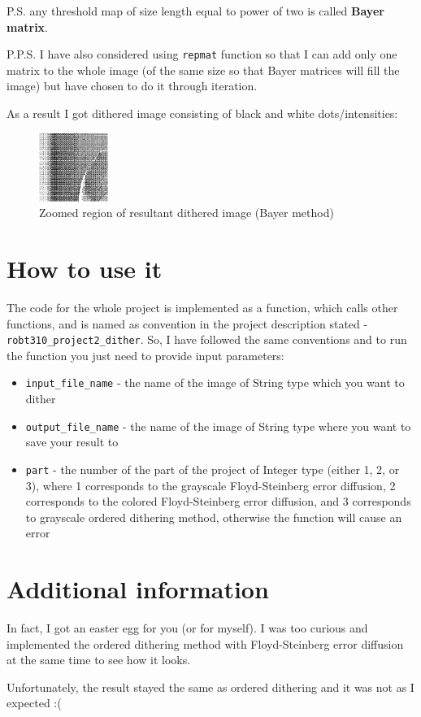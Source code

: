 \documentclass{IEEEtran}
\begin{document}
P.S. any threshold map of size length equal to power of two is called \textbf{Bayer matrix}.

P.P.S. I have also considered using \texttt{repmat} function so that I can add only one matrix to the whole image (of the same size so that Bayer matrices will fill the image) but have chosen to do it through iteration.

As a result I got dithered image consisting of black and white dots/intensities:

\begin{figure}[h]
	\centering
	\includegraphics[width=0.20\textwidth]{ordered_result_zoomed.png}
	\caption{Zoomed region of resultant dithered image (Bayer method)}
\end{figure}



\section{How to use it}
The code for the whole project is implemented as a function, which calls other functions, and is named as convention in the project description stated - \texttt{robt310{\_}project2{\_}dither}. So, I have followed the same conventions and to run the function you just need to provide input parameters:

\begin{itemize}
  \item \texttt{input{\_}file{\_}name} - the name of the image of String type which you want to dither
  \item \texttt{output{\_}file{\_}name} - the name of the image of String type where you want to save your result to
  \item \texttt{part} - the number of the part of the project of Integer type (either 1, 2, or 3), where 1 corresponds to the grayscale Floyd-Steinberg error diffusion, 2 corresponds to the colored Floyd-Steinberg error diffusion, and 3 corresponds to grayscale ordered dithering method, otherwise the function will cause an error
\end{itemize}

\section{Additional information}
In fact, I got an easter egg for you (or for myself). I was too curious and implemented the ordered dithering method with Floyd-Steinberg error diffusion at the same time to see how it looks.

Unfortunately, the result stayed the same as ordered dithering and it was not as I expected :(
\end{document}
